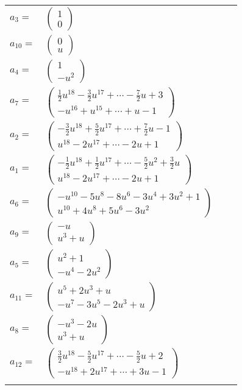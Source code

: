 \documentclass[1p]{elsarticle_modified}
\theoremstyle{definition}
\begin{document}
\begin{tabular}{m{7pt} m{180pt} m{7pt} m{180pt} }
\flushright $a_{3}=$&$\begin{pmatrix}1\\0\end{pmatrix}$ \\
\flushright $a_{10}=$&$\begin{pmatrix}0\\u\end{pmatrix}$ \\
\flushright $a_{4}=$&$\begin{pmatrix}1\\- u^2\end{pmatrix}$ \\
\flushright $a_{7}=$&$\begin{pmatrix}\frac{1}{2} u^{18}-\frac{3}{2} u^{17}+\cdots-\frac{7}{2} u+3\\- u^{16}+u^{15}+\cdots+u-1\end{pmatrix}$ \\
\flushright $a_{2}=$&$\begin{pmatrix}-\frac{3}{2} u^{18}+\frac{5}{2} u^{17}+\cdots+\frac{7}{2} u-1\\u^{18}-2 u^{17}+\cdots-2 u+1\end{pmatrix}$ \\
\flushright $a_{1}=$&$\begin{pmatrix}-\frac{1}{2} u^{18}+\frac{1}{2} u^{17}+\cdots-\frac{5}{2} u^2+\frac{3}{2} u\\u^{18}-2 u^{17}+\cdots-2 u+1\end{pmatrix}$ \\
\flushright $a_{6}=$&$\begin{pmatrix}- u^{10}-5 u^8-8 u^6-3 u^4+3 u^2+1\\u^{10}+4 u^8+5 u^6-3 u^2\end{pmatrix}$ \\
\flushright $a_{9}=$&$\begin{pmatrix}- u\\u^3+u\end{pmatrix}$ \\
\flushright $a_{5}=$&$\begin{pmatrix}u^2+1\\- u^4-2 u^2\end{pmatrix}$ \\
\flushright $a_{11}=$&$\begin{pmatrix}u^5+2 u^3+u\\- u^7-3 u^5-2 u^3+u\end{pmatrix}$ \\
\flushright $a_{8}=$&$\begin{pmatrix}- u^3-2 u\\u^3+u\end{pmatrix}$ \\
\flushright $a_{12}=$&$\begin{pmatrix}\frac{3}{2} u^{18}-\frac{5}{2} u^{17}+\cdots-\frac{5}{2} u+2\\- u^{18}+2 u^{17}+\cdots+3 u-1\end{pmatrix}$\\&\end{tabular}
\end{document}
